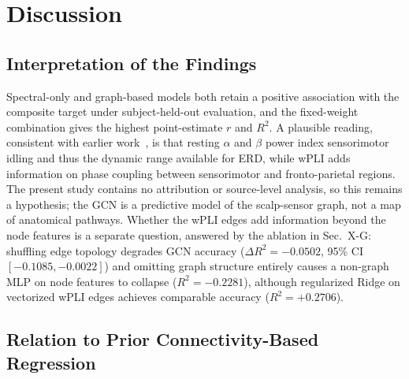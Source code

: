 \documentclass{ieeeaccess}
\begin{document}
\section{Discussion}

\subsection{Interpretation of the Findings}

Spectral-only and graph-based models both retain a positive association with the composite target under subject-held-out evaluation, and the fixed-weight combination gives the highest point-estimate $r$ and $R^2$. A plausible reading, consistent with earlier work~\cite{blankertz2010,pfurtscheller2001}, is that resting $\alpha$ and $\beta$ power index sensorimotor idling and thus the dynamic range available for ERD, while wPLI adds information on phase coupling between sensorimotor and fronto-parietal regions. The present study contains no attribution or source-level analysis, so this remains a hypothesis; the GCN is a predictive model of the scalp-sensor graph, not a map of anatomical pathways. Whether the wPLI edges add information beyond the node features is a separate question, answered by the ablation in Sec.~X-G: shuffling edge topology degrades GCN accuracy ($\Delta R^2 = -0.0502$, 95\% CI $[-0.1085, -0.0022]$) and omitting graph structure entirely causes a non-graph MLP on node features to collapse ($R^2 = -0.2281$), although regularized Ridge on vectorized wPLI edges achieves comparable accuracy ($R^2 = +0.2706$).

\subsection{Relation to Prior Connectivity-Based Regression}
\end{document}
